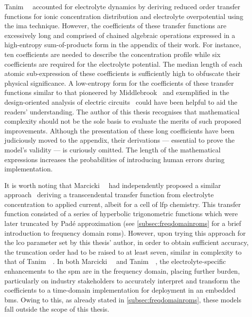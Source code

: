 Tanim~\etal~\cite{Tanim2014}  accounted  for  electrolyte dynamics  by  deriving
reduced   order  transfer   functions  for   ionic  concentration   distribution
and   electrolyte  overpotential   using  the   \gls{ima}  technique.   However,
the  coefficients  of   these  transfer  functions  are   excessively  long  and
comprised  of   chained  algebraic   operations  expressed  in   a  high-entropy
sum-of-products  form  in  the  appendix   of  their  work.  For  instance,  ten
coefficients  are  needed  to  describe  the  concentration  profile  while  six
coefficients  are required  for  the electrolyte  potential.  The median  length
of  each  atomic  sub-expression  of these  coefficients  is  sufficiently  high
to  obfuscate   their  physical  significance.   A  low-entropy  form   for  the
coefficients  of  these   transfer  functions  similar  to   that  pioneered  by
Middlebrook~\cite{Middlebrook} and  exemplified in the  design-oriented analysis
of  electric   circuits~\cite{Middlebrook1998,Vorperian2002}  could   have  been
helpful to aid the readers' understanding.  The author of this thesis recognises
that  mathematical complexity  should  not be  the sole  basis  to evaluate  the
merits of  such proposed improvements.  Although the presentation of  these long
coefficients have been judiciously moved  to the appendix, their derivations ---
essential to prove the model's validity  --- is curiously omitted. The length of
the mathematical  expressions increases  the probabilities of  introducing human
errors during implementation.

It  is worth  noting that  Marcicki~\etal~\cite{Marcicki2013} had  independently
proposed a similar approach \viz~deriving a transcendental transfer function
from  electrolyte  concentration  to  applied  current, albeit  for  a  cell  of
\gls{lfp} chemistry. This transfer function  consisted of a series of hyperbolic
trigonometric functions which  were later truncated by  Padé approximation (see
\cref{subsec:freqdomainroms}  for  a  brief  introduction  to  frequency  domain
\glspl{rom}). However, upon trying this approach for the \gls{lco} parameter set
by this thesis'  author, in order to obtain sufficient  accuracy, the truncation
order had  to be  raised to  at least seven,  similar in  complexity to  that of
Tanim~\etal~\cite{Tanim2014a}.  In  both Marcicki~\etal~\cite{Marcicki2013}  and
Tanim~\etal~\cite{Tanim2014a},  the  electrolyte-specific  enhancements  to  the
\gls{spm} are in  the frequency domain, placing further  burden, particularly on
industry stakeholders to accurately interpret  and transform the coefficients to
a time-domain implementation  for deployment in an embedded  \gls{bms}. Owing to
this,  as  already  stated in \cref{subsec:freqdomainroms},  these  models  fall
outside the scope of this thesis.


